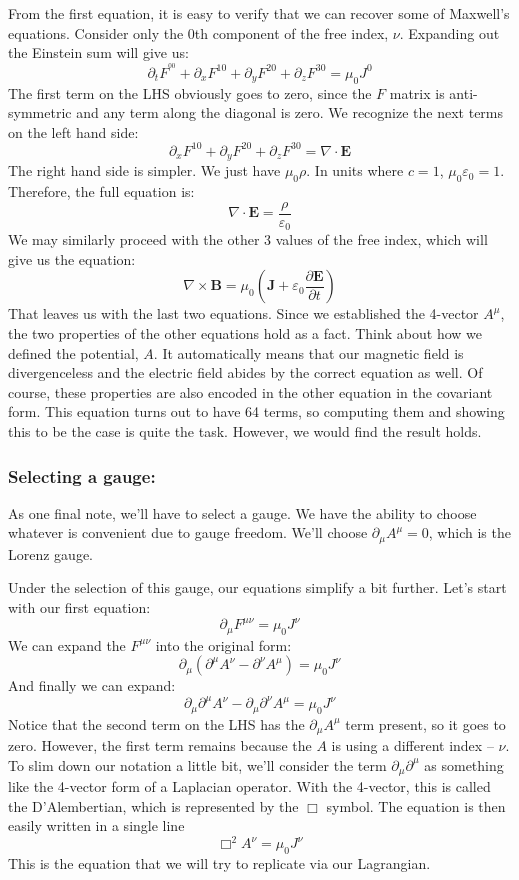 From the first equation, it is easy to verify that we can recover some of Maxwell's equations. Consider only the 0th component of the free index, $\nu$. Expanding out the Einstein sum will give us:
$$\partial_tF^{^{00}}+\partial_xF^{10}+\partial_yF^{20}+\partial_zF^{30}=\mu_0J^0$$
The first term on the LHS obviously goes to zero, since the $F$ matrix is anti-symmetric and any term along the diagonal is zero. We recognize the next terms on the left hand side:
$$\partial_xF^{10}+\partial_yF^{20}+\partial_zF^{30}=\nabla\cdot \bm{E}$$
The right hand side is simpler. We just have $\mu_0\rho$. In units where $c=1$, $\mu_0\varepsilon_0=1$. Therefore, the full equation is:
$$\nabla\cdot \bm{E}=\frac{\rho}{\varepsilon_0}$$
We may similarly proceed with the other 3 values of the free index, which will give us the equation:
$$\nabla\times\bm{B}=\mu_0\left(\bm{J}+\varepsilon_0\frac{\partial\bm{E}}{\partial t}\right)$$
That leaves us with the last two equations. Since we established the 4-vector $A^\mu$, the two properties of the other equations hold as a fact. Think about how we defined the potential, $A$. It automatically means that our magnetic field is divergenceless and the electric field abides by the correct equation as well. Of course, these properties are also encoded in the other equation in the covariant form. This equation turns out to have 64 terms, so computing them and showing this to be the case is quite the task. However, we would find the result holds.

\subsubsection{Selecting a gauge:}
As one final note, we'll have to select a gauge. We have the ability to choose whatever is convenient due to gauge freedom. We'll choose $\partial_\mu A^\mu=0$, which is the Lorenz gauge.

Under the selection of this gauge, our equations simplify a bit further. Let's start with our first equation:
$$\partial_\mu F^{\mu\nu}=\mu_0J^\nu$$
We can expand the $F^{\mu\nu}$ into the original form:
$$\partial_\mu (\partial^\mu A^\nu - \partial ^\nu A^\mu)=\mu_0J^\nu$$
And finally we can expand:
$$\partial_\mu \partial^\mu A^\nu - \partial_\mu\partial ^\nu A^\mu=\mu_0J^\nu$$
Notice that the second term on the LHS has the $\partial_\mu A^\mu$ term present, so it goes to zero. However, the first term remains because the $A$ is using a different index -- $\nu$. To slim down our notation a little bit, we'll consider the term $\partial_\mu \partial^\mu$ as something like the 4-vector form of a Laplacian operator. With the 4-vector, this is called the D'Alembertian, which is represented by the $\Box$ symbol. The equation is then easily written in a single line
$$\Box^2A^\nu=\mu_0J^\nu$$
This is the equation that we will try to replicate via our \gls{Lagrangian}.

